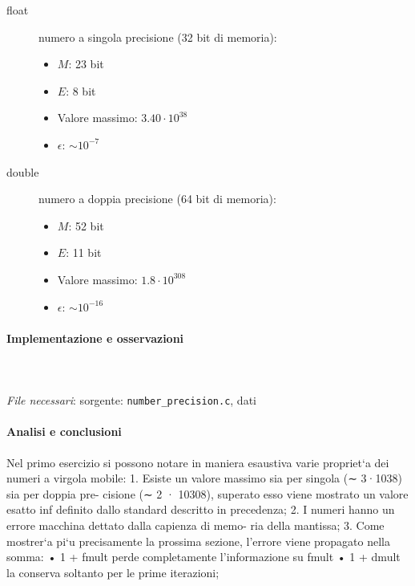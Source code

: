 \begin{description}
	\item[float] numero a singola precisione (32 bit di memoria):
		\begin{itemize}
			\item $M$: 23 bit
			\item $E$: 8 bit
			\item Valore massimo: $3.40 \cdot 10^{38}$
			\item $\epsilon$: $\sim 10^{-7}$
		\end{itemize}
	\item[double] numero a doppia precisione (64 bit di memoria):
		\begin{itemize}
			\item $M$: 52 bit
			\item $E$: 11 bit
			\item Valore massimo: $1.8 \cdot 10^{308}$
			\item $\epsilon$: $\sim 10^{-16}$
		\end{itemize}

\end{description}

\paragraph{Implementazione e osservazioni} \mbox{}\\
\\
\textit{File necessari}: sorgente: \texttt{number\_precision.c}, dati 
\\


\paragraph{Analisi e conclusioni}

Nel
primo esercizio si possono notare in maniera esaustiva varie propriet`a dei
numeri a virgola mobile:
1. Esiste un valore massimo sia per singola (∼ 3·1038) sia per doppia pre-
cisione (∼ 2 · 10308), superato esso viene mostrato un valore esatto inf
definito dallo standard descritto in precedenza;
2. I numeri hanno un errore macchina dettato dalla capienza di memo-
ria della mantissa;
3. Come mostrer`a pi`u precisamente la prossima sezione, l’errore viene
propagato nella somma:
• 1 + fmult perde completamente l’informazione su fmult
• 1 + dmult la conserva soltanto per le prime iterazioni;

